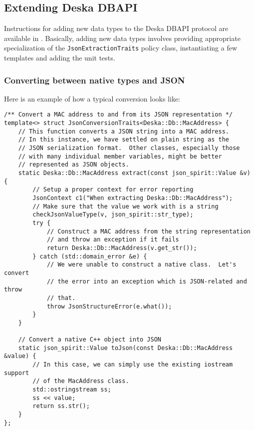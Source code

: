 \documentclass[deska]{subfiles}
\begin{document}
\subsection{Extending Deska DBAPI}

Instructions for adding new data types to the Deska DBAPI protocol are available in .
Basically, adding new data types involves providing appropriate specialization of the {\tt JsonExtractionTraits} policy
class, instantiating a few templates and adding the unit tests.

\subsubsection{Converting between native types and JSON}

Here is an example of how a typical conversion looks like:

\begin{verbatim}
/** Convert a MAC address to and from its JSON representation */
template<> struct JsonConversionTraits<Deska::Db::MacAddress> {
    // This function converts a JSON string into a MAC address.
    // In this instance, we have settled on plain string as the
    // JSON serialization format.  Other classes, especially those
    // with many individual member variables, might be better
    // represented as JSON objects.
    static Deska::Db::MacAddress extract(const json_spirit::Value &v) {
        // Setup a proper context for error reporting
        JsonContext c1("When extracting Deska::Db::MacAddress");
        // Make sure that the value we work with is a string
        checkJsonValueType(v, json_spirit::str_type);
        try {
            // Construct a MAC address from the string representation
            // and throw an exception if it fails
            return Deska::Db::MacAddress(v.get_str());
        } catch (std::domain_error &e) {
            // We were unable to construct a native class.  Let's convert
            // the error into an exception which is JSON-related and throw
            // that.
            throw JsonStructureError(e.what());
        }
    }

    // Convert a native C++ object into JSON
    static json_spirit::Value toJson(const Deska::Db::MacAddress &value) {
        // In this case, we can simply use the existing iostream support
        // of the MacAddress class.
        std::ostringstream ss;
        ss << value;
        return ss.str();
    }
};
\end{verbatim}
\end{document}
